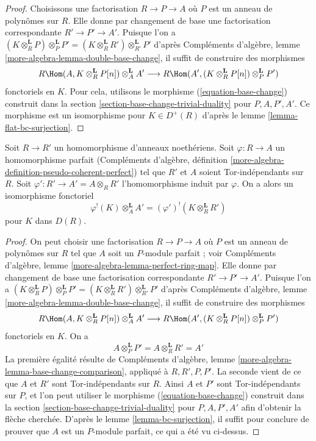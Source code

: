 \begin{proof}
Choisissons une factorisation $R \to P \to A$ où $P$ est un anneau de polynômes sur $R$.
Elle donne par changement de base une factorisation correspondante $R' \to P' \to A'$.
Puisque l'on a $(K \otimes_R^\mathbf{L} P) \otimes_P^\mathbf{L} P' =
(K \otimes_R^\mathbf{L} R') \otimes_{R'}^\mathbf{L} P'$ d'après Compléments d'algèbre, lemme \ref{more-algebra-lemma-double-base-change},
il suffit de construire des morphismes
$$
R\Hom(A, K \otimes_R^\mathbf{L} P[n]) \otimes_A^\mathbf{L} A'
\longrightarrow
R\Hom(A', (K \otimes_R^\mathbf{L} P[n]) \otimes_P^\mathbf{L} P')
$$
fonctoriels en $K$. Pour cela, utilisons le morphisme (\ref{equation-base-change})
construit dans la section \ref{section-base-change-trivial-duality} pour $P, A, P', A'$.
Ce morphisme est un isomorphisme pour $K \in D^+(R)$ d'après le lemme \ref{lemma-flat-bc-surjection}.
\end{proof}

\begin{lemma}
\label{lemma-bc}
Soit $R \to R'$ un homomorphisme d'anneaux noethériens.
Soit $\varphi : R \to A$ un homomorphisme parfait
(Compléments d'algèbre, définition \ref{more-algebra-definition-pseudo-coherent-perfect})
tel que $R'$ et $A$ soient Tor-indépendants sur $R$.
Soit $\varphi' : R' \to A' = A \otimes_R R'$ l'homomorphisme induit par $\varphi$.
On a alors un isomorphisme fonctoriel
$$
\varphi^!(K) \otimes_A^\mathbf{L} A' =
(\varphi')^!(K \otimes_R^\mathbf{L} R')
$$
pour $K$ dans $D(R)$.
\end{lemma}

\begin{proof}
On peut choisir une factorisation $R \to P \to A$ où $P$ est un anneau de polynômes
sur $R$ tel que $A$ soit un $P$-module parfait ;
voir Compléments d'algèbre, lemme \ref{more-algebra-lemma-perfect-ring-map}.
Elle donne par changement de base une factorisation correspondante $R' \to P' \to A'$.
Puisque l'on a $(K \otimes_R^\mathbf{L} P) \otimes_P^\mathbf{L} P' =
(K \otimes_R^\mathbf{L} R') \otimes_{R'}^\mathbf{L} P'$ d'après Compléments d'algèbre, lemme \ref{more-algebra-lemma-double-base-change},
il suffit de construire des morphismes
$$
R\Hom(A, K \otimes_R^\mathbf{L} P[n]) \otimes_A^\mathbf{L} A'
\longrightarrow
R\Hom(A', (K \otimes_R^\mathbf{L} P[n]) \otimes_P^\mathbf{L} P')
$$
fonctoriels en $K$. On a
$$
A \otimes_P^\mathbf{L} P' = A \otimes_R^\mathbf{L} R' = A'
$$
La première égalité résulte de Compléments d'algèbre, lemme \ref{more-algebra-lemma-base-change-comparison},
appliqué à $R, R', P, P'$. La seconde vient de ce que $A$ et $R'$
sont Tor-indépendants sur $R$.
Ainsi $A$ et $P'$ sont Tor-indépendants sur $P$,
et l'on peut utiliser le morphisme (\ref{equation-base-change}) construit dans la section \ref{section-base-change-trivial-duality}
pour $P, A, P', A'$ afin d'obtenir la flèche cherchée.
D'après le lemme \ref{lemma-bc-surjection}, il suffit pour conclure de prouver que $A$
est un $P$-module parfait, ce qui a été vu ci-dessus.
\end{proof}

